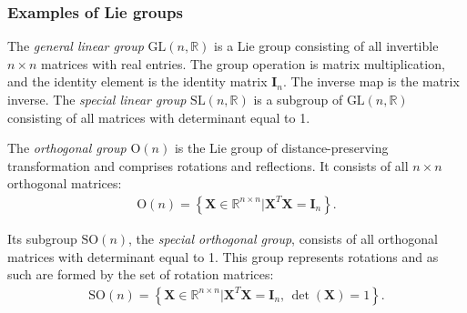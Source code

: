 \subsubsection{Examples of Lie groups}
\begin{example}\label{ex:general-linear-group-special-linear-group}
    The \emph{general linear group} $\text{GL}(n, \mathbb{R})$ is a Lie group consisting of all invertible $n\times n$ matrices with real entries. The group operation is matrix multiplication, and the identity element is the identity matrix $\mathbf{I}_n$. The inverse map is the matrix inverse. The \emph{special linear group} $\text{SL}(n, \mathbb{R})$ is a subgroup of $\text{GL}(n, \mathbb{R})$ consisting of all matrices with determinant equal to 1.
\end{example}
\begin{example}\label{ex:orthogonal-group-special-orthogonal-group}
    The \emph{orthogonal group} $\text{O}(n)$ is the Lie group of distance-preserving transformation and comprises rotations and reflections. It consists of all $n\times n$ orthogonal matrices:
    \begin{align}
        \text{O}(n) = \left\{\mathbf{X}\in\mathbb{R}^{n\times n} | \mathbf{X}^T\mathbf{X} = \mathbf{I}_n\right\}.
    \end{align}

    Its subgroup $\text{SO}(n)$, the \emph{special orthogonal group}, consists of all orthogonal matrices with determinant equal to 1. This group represents rotations and as such are formed by the set of rotation matrices:
    \begin{align}
        \text{SO}(n) = \left\{\mathbf{X}\in\mathbb{R}^{n\times n} | \mathbf{X}^T\mathbf{X} = \mathbf{I}_n,\, \det(\mathbf{X}) = 1\right\}.
    \end{align}
\end{example}
